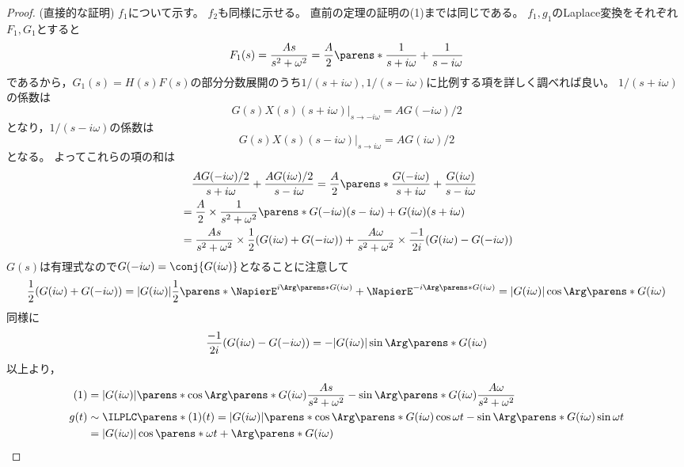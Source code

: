             \begin{proof}
                (直接的な証明)
                $f_1$について示す。
                $f_2$も同様に示せる。
                直前の定理の証明の(1)までは同じである。
                $f_1,g_1$のLaplace変換をそれぞれ$F_1,G_1$とすると
                \[ F_1(s) = \frac{As}{s^2+\omega^2} = \frac{A}{2}\parens*{\frac{1}{s+i\omega} + \frac{1}{s-i\omega}} \]
                であるから，$G_1(s) = H(s)F(s)$の部分分数展開のうち$1/(s+i\omega),1/(s-i\omega)$に比例する項を詳しく調べれば良い。
                $1/(s+i\omega)$の係数は
                \[ \left. G(s)X(s)(s+i\omega) \right|_{s\to-i\omega} = AG(-i\omega)/2\]
                となり，$1/(s-i\omega)$の係数は
                \[ \left. G(s)X(s)(s-i\omega) \right|_{s\to i\omega} = AG(i\omega)/2\]
                となる。
                よってこれらの項の和は
                \begin{align}
                    &\quad \frac{AG(-i\omega)/2}{s+i\omega} + \frac{AG(i\omega)/2}{s-i\omega} = \frac{A}{2}\parens*{\frac{G(-i\omega)}{s+i\omega} + \frac{G(i\omega)}{s-i\omega}} \nonumber\\
                    &= \frac{A}{2}\times\frac{1}{s^2+\omega^2}\parens*{G(-i\omega)(s-i\omega) + G(i\omega)(s+i\omega)} \nonumber\\
                    &= \frac{As}{s^2+\omega^2}\times\frac{1}{2}(G(i\omega)+G(-i\omega)) + \frac{A\omega}{s^2+\omega^2}\times\frac{-1}{2i}(G(i\omega)-G(-i\omega))
                \end{align}
                $G(s)$は有理式なので$G(-i\omega) = \conj{G(i\omega)}$となることに注意して
                \[ \frac{1}{2}(G(i\omega)+G(-i\omega)) = |G(i\omega)|\frac{1}{2}\parens*{\NapierE^{i\Arg\parens*{G(i\omega)}} + \NapierE^{-i\Arg\parens*{G(i\omega)}}} = |G(i\omega)|\cos\Arg\parens*{G(i\omega)} \]
                同様に
                \[ \frac{-1}{2i}(G(i\omega)-G(-i\omega)) = -|G(i\omega)|\sin\Arg\parens*{G(i\omega)} \]
                以上より，
                \begin{align*}
                    (1) &= |G(i\omega)|\parens*{\cos\Arg\parens*{G(i\omega)}\frac{As}{s^2+\omega^2} - \sin\Arg\parens*{G(i\omega)}\frac{A\omega}{s^2+\omega^2} } \\
                    g(t) &\sim \ILPLC\parens*{(1)}(t) = |G(i\omega)|\parens*{\cos\Arg\parens*{G(i\omega)}\cos\omega t - \sin\Arg\parens*{G(i\omega)}\sin\omega t } \\
                    &= |G(i\omega)|\cos\parens*{\omega t + \Arg\parens*{G(i\omega)}}
                \end{align*}
            \end{proof}